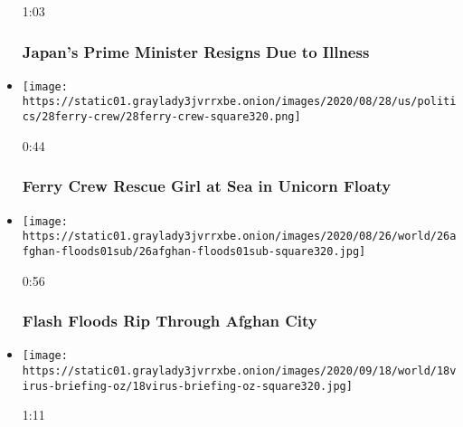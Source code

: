 \begin{itemize}
  1:03

  \hypertarget{japans-prime-minister-resigns-due-to-illness}{%
  \subsubsection{Japan's Prime Minister Resigns Due to
  Illness}\label{japans-prime-minister-resigns-due-to-illness}}
\item
  \href{https://www.nytimes3xbfgragh.onion/video/us/politics/100000007313169/greece-rescue-lost-girl-unicorn-floaty.html?action=click\&module=video-series-bar\&region=header\&pgtype=Article\&playlistId=video/world}{}

  \texttt{[image: https://static01.graylady3jvrrxbe.onion/images/2020/08/28/us/politics/28ferry-crew/28ferry-crew-square320.png]}

  0:44

  \hypertarget{ferry-crew-rescue-girl-at-sea-in-unicorn-floaty}{%
  \subsubsection{Ferry Crew Rescue Girl at Sea in Unicorn
  Floaty}\label{ferry-crew-rescue-girl-at-sea-in-unicorn-floaty}}
\item
  \href{https://www.nytimes3xbfgragh.onion/video/us/100000007308896/afghan-floods-video.html?action=click\&module=video-series-bar\&region=header\&pgtype=Article\&playlistId=video/world}{}

  \texttt{[image: https://static01.graylady3jvrrxbe.onion/images/2020/08/26/world/26afghan-floods01sub/26afghan-floods01sub-square320.jpg]}

  0:56

  \hypertarget{flash-floods-rip-through-afghan-city}{%
  \subsubsection{Flash Floods Rip Through Afghan
  City}\label{flash-floods-rip-through-afghan-city}}
\item
  \href{https://www.nytimes3xbfgragh.onion/video/us/politics/100000007296394/australia-coronavirus-vaccine.html?action=click\&module=video-series-bar\&region=header\&pgtype=Article\&playlistId=video/world}{}

  \texttt{[image: https://static01.graylady3jvrrxbe.onion/images/2020/09/18/world/18virus-briefing-oz/18virus-briefing-oz-square320.jpg]}

  1:11


\end{itemize}
